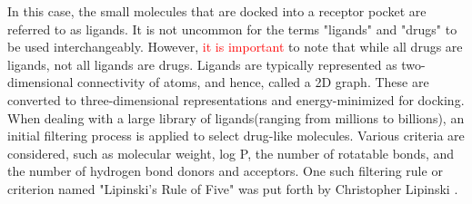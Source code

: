 In this case, the small molecules that are docked into a receptor pocket are referred to as ligands. It is not uncommon for the terms "ligands" and "drugs" to be used interchangeably. However, \textcolor{red}{it is important} to note that while all drugs are ligands, not all ligands are drugs. Ligands are typically represented as two-dimensional connectivity of atoms, and hence, called a 2D graph. These are converted to three-dimensional representations  and energy-minimized for docking.  When dealing with a large library of ligands\cite{bib10}(ranging from millions to billions), an initial filtering process is applied to select drug-like molecules. Various criteria are considered, such as molecular weight, log P, the number of rotatable bonds, and the number of hydrogen bond donors and acceptors. One such filtering  rule or criterion named "Lipinski's  Rule of Five" was put forth by Christopher Lipinski \cite{bib11}. {} 

